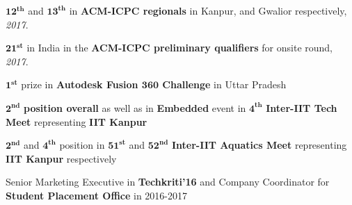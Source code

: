 \begin{cventries}
  \cvsoloentry
    {
      \begin{cvitems}
      \item{$\bm{12^{th}}$ and $\bm{13^{th}}$ in \textbf{ACM-ICPC regionals} in Kanpur, and Gwalior respectively, \textit{2017}.}
      \item{$\bm{21^{st}}$ in India in the \textbf{ACM-ICPC preliminary qualifiers} for onsite round, \textit{2017}.}
        \item{$\bm{1^{st}}$ prize in \textbf{Autodesk Fusion $\textbf{360}$ Challenge} in Uttar Pradesh}
        \item{$\bm{2^{nd}}$ \textbf{position overall} as well as in \textbf{Embedded} event in $\bm{4^{th}}$ \textbf{Inter-IIT Tech Meet} representing \textbf{IIT Kanpur}}
        \item{$\bm{2^{nd}}$ and $\bm{4^{th}}$ position in $\bm{51^{st}}$ and $\bm{52^{nd}}$ \textbf{Inter-IIT Aquatics Meet} representing \textbf{IIT Kanpur} respectively}
        \item{Senior Marketing Executive in \textbf{Techkriti'16} and Company Coordinator for \textbf{Student Placement Office} in 2016-2017}
      \end{cvitems}
    }
    
  
\end{cventries}
